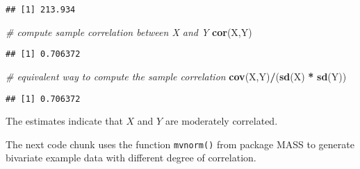 \documentclass[]{book}
\newenvironment{Shaded}{\begin{snugshade}}{\end{snugshade}}
\newcommand{\KeywordTok}[1]{\textcolor[rgb]{0.13,0.29,0.53}{\textbf{#1}}}
\newcommand{\StringTok}[1]{\textcolor[rgb]{0.31,0.60,0.02}{#1}}
\newcommand{\CommentTok}[1]{\textcolor[rgb]{0.56,0.35,0.01}{\textit{#1}}}
\newcommand{\OperatorTok}[1]{\textcolor[rgb]{0.81,0.36,0.00}{\textbf{#1}}}
\newcommand{\NormalTok}[1]{#1}
\theoremstyle{definition}
\theoremstyle{definition}
\theoremstyle{definition}
\theoremstyle{remark}
\begin{document}
\begin{verbatim}
## [1] 213.934
\end{verbatim}

\begin{Shaded}
\begin{Highlighting}[]
\CommentTok{# compute sample correlation between X and Y}
\KeywordTok{cor}\NormalTok{(X,Y)}
\end{Highlighting}
\end{Shaded}

\begin{verbatim}
## [1] 0.706372
\end{verbatim}

\begin{Shaded}
\begin{Highlighting}[]
\CommentTok{# equivalent way to compute the sample correlation}
\KeywordTok{cov}\NormalTok{(X,Y)}\OperatorTok{/}\NormalTok{(}\KeywordTok{sd}\NormalTok{(X) }\OperatorTok{*}\StringTok{ }\KeywordTok{sd}\NormalTok{(Y))}
\end{Highlighting}
\end{Shaded}

\begin{verbatim}
## [1] 0.706372
\end{verbatim}

The estimates indicate that \(X\) and \(Y\) are moderately correlated.

The next code chunk uses the function \texttt{mvnorm()} from package
MASS to generate bivariate example data with different degree of
correlation.
\end{document}
